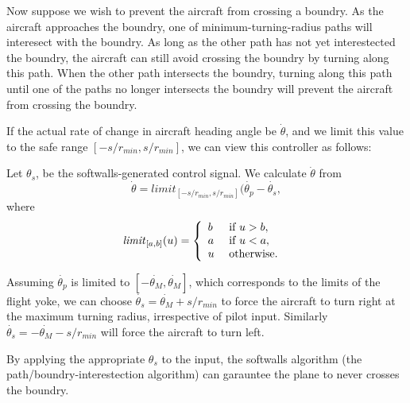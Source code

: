 \documentclass[11pt]{article}
\begin{document}
Now suppose we wish to prevent the aircraft from crossing a boundry.
As the aircraft approaches the boundry, one of minimum-turning-radius
paths will interesect with the boundry.  As long as the other path has
not yet interestected the boundry, the aircraft can still avoid
crossing the boundry by turning along this path.  When the other path
intersects the boundry, turning along this path until one of the paths
no longer intersects the boundry will prevent the aircraft from
crossing the boundry.

If the actual rate of change in aircraft heading angle be
$\dot{\theta}$, and we limit this value to the safe range
$[-s/r_{min}, s/r_{min}]$, we can view this controller as follows:

Let $\theta_{s}$, be the softwalls-generated control signal.  We
calculate $\dot{\theta}$ from
\[
\dot{\theta} = limit_{[-s/r_{min}, s/r_{min}]}(\dot{\theta_{p}} -
\dot{\theta_{s}},
\]
where
\[
\mbox{\textit{limit}}_{[a,b]}(u) = \left \{
\begin{array}{ll}
b&\mbox{ if } u > b,\\
a&\mbox{ if } u < a,\\
u&\mbox{ otherwise. }
\end{array}
\right .
\]

Assuming $\dot{\theta_{p}}$ is limited to $[-\dot{\theta_{M}},
\dot{\theta_{M}}]$, which corresponds to the limits of the flight
yoke, we can choose $\dot{\theta_{s}} = \dot{\theta_{M}} + s/r_{min}$
to force the aircraft to turn right at the maximum turning radius,
irrespective of pilot input.  Similarly $\dot{\theta_{s}} =
-\dot{\theta_{M}} - s/r_{min}$ will force the aircraft to turn left.

By applying the appropriate $\theta_{s}$ to the input, the softwalls
algorithm (the path/boundry-interestection algorithm) can garauntee the
plane to never crosses the boundry.  
\end{document}
